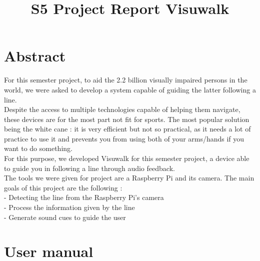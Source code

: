 \documentclass{rapport}
\title{S5 Project Report Visuwalk} %
\begin{document}



        
\fairemarges %
\fairepagedegarde %
\tableofcontents%
\newpage

\section{Abstract}


For this semester project, to aid the 2.2 billion visually impaired persons in the world, we were asked to develop a system capable of guiding the latter following a line.\\ Despite the access to multiple technologies capable of helping them navigate, these devices are for the most part not fit for sports. The most popular solution being the white cane : it is very efficient but not so practical, as it needs a lot of practice to use it and prevents you from using both of your arms/hands if you want to do something.\\For this purpose, we developed Visuwalk for this semester project, a device able to guide you in following a line through audio feedback.\\
The tools we were given for project are a Raspberry Pi and its camera. The main goals of this project are the following :\\
- Detecting the line from the Raspberry Pi’s camera\\
- Process the information given by the line\\
- Generate sound cues to guide the user

\section {User manual}
\end{document}
